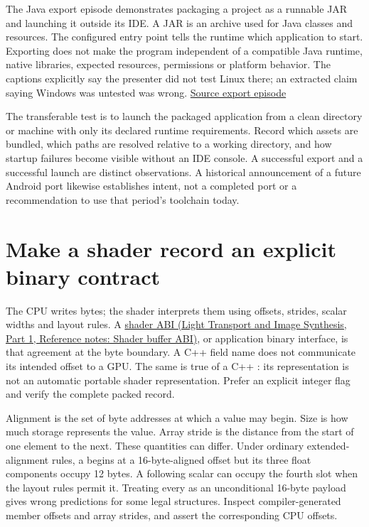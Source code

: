 \hypertarget{01-foundations-i-ch008-packaging-removes-an-editor-dependency-not-every-runtime-dependency}{}

The Java export episode demonstrates packaging a project as a runnable JAR and launching it outside its IDE. A JAR is an archive used for Java classes and resources. The configured entry point tells the runtime which application to start. Exporting does not make the program independent of a compatible Java runtime, native libraries, expected resources, permissions or platform behavior. The captions explicitly say the presenter did not test Linux there; an extracted claim saying Windows was untested was wrong. \href{https://www.youtube.com/watch?v=velhSXA2CnQ}{Source export episode}

The transferable test is to launch the packaged application from a clean directory or machine with only its declared runtime requirements. Record which assets are bundled, which paths are resolved relative to a working directory, and how startup failures become visible without an IDE console. A successful export and a successful launch are distinct observations. A historical announcement of a future Android port likewise establishes intent, not a completed port or a recommendation to use that period's toolchain today.

\section{Make a shader record an explicit binary contract}\label{01-foundations-i-ch008-make-a-shader-record-an-explicit-binary-contract}

\hypertarget{01-foundations-i-ch008-make-a-shader-record-an-explicit-binary-contract}{}

The CPU writes bytes; the shader interprets them using offsets, strides, scalar widths and layout rules. A \href{../04-Light-Transport-and-Image-Synthesis-P01/main.pdf\#appendix-749048795dbb}{shader ABI (Light Transport and Image Synthesis, Part 1, Reference notes: Shader buffer ABI)}, or application binary interface, is that agreement at the byte boundary. A C++ field name does not communicate its intended offset to a GPU. The same is true of a C++ : its representation is not an automatic portable shader representation. Prefer an explicit integer flag and verify the complete packed record.

Alignment is the set of byte addresses at which a value may begin. Size is how much storage represents the value. Array stride is the distance from the start of one element to the next. These quantities can differ. Under ordinary extended-alignment  rules, a  begins at a 16-byte-aligned offset but its three float components occupy 12 bytes. A following scalar can occupy the fourth slot when the layout rules permit it. Treating every  as an unconditional 16-byte payload gives wrong predictions for some legal structures. Inspect compiler-generated member offsets and array strides, and assert the corresponding CPU offsets.

